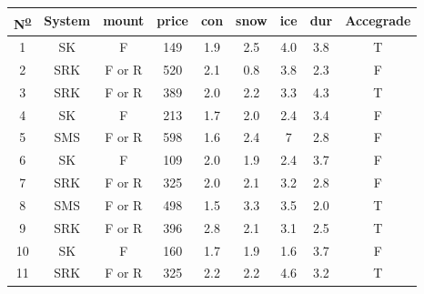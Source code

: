 \documentclass[12pt]{report}
\begin{document}
\begin{solution}
\begin{enumerate}
\begin{itemize}
              \begin{table}[H]
                \centering
                \begin{tabular}{|c|c|c|c|c|c|c|c|c|}
                \hline
                N\textsuperscript{\underline{o}} & System                      & mount  & price                       & con & snow                        & ice & dur & Accegrade \\ \hline
                \rowcolor[HTML]{34FF34} 
                1  & SK                          & F      & 149                         & 1.9 & 2.5                         & 4.0 & 3.8 & T         \\ \hline
                2  & \cellcolor[HTML]{FE0000}SRK & F or R & 520                         & 2.1 & 0.8                         & 3.8 & 2.3 & F         \\ \hline
                3  & \cellcolor[HTML]{FE0000}SRK & F or R & 389                         & 2.0 & 2.2                         & 3.3 & 4.3 & T         \\ \hline
                4  & SK                          & F      & \cellcolor[HTML]{FE0000}213 & 1.7 & 2.0                         & 2.4 & 3.4 & F         \\ \hline
                5  & \cellcolor[HTML]{FE0000}SMS & F or R & 598                         & 1.6 & 2.4                         & 7   & 2.8 & F         \\ \hline
                6  & SK                          & F      & 109                         & 2.0 & \cellcolor[HTML]{FE0000}1.9 & 2.4 & 3.7 & F         \\ \hline
                7  & \cellcolor[HTML]{FE0000}SRK & F or R & 325                         & 2.0 & 2.1                         & 3.2 & 2.8 & F         \\ \hline
                8  & \cellcolor[HTML]{FE0000}SMS & F or R & 498                         & 1.5 & 3.3                         & 3.5 & 2.0 & T         \\ \hline
                9  & \cellcolor[HTML]{FE0000}SRK & F or R & 396                         & 2.8 & 2.1                         & 3.1 & 2.5 & T         \\ \hline
                10 & SK                          & F      & \cellcolor[HTML]{FE0000}160 & 1.7 & 1.9                         & 1.6 & 3.7 & F         \\ \hline
                11 & \cellcolor[HTML]{FE0000}SRK & F or R & 325                         & 2.2 & 2.2                         & 4.6 & 3.2 & T         \\ \hline

\end{tabular}
\end{table}
\end{itemize}
\end{enumerate}
\end{solution}
\end{document}
